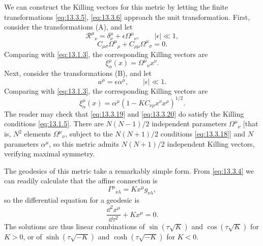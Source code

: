We can construct the Killing vectors for this metric by letting the finite
transformations \eqref{eq:13.3.5}, \eqref{eq:13.3.6} approach the unit
transformation. First, consider the transformations (A), and let
\[
  \mathscr R^\mu{}_\nu
  =
  \delta^\mu_\nu+\epsilon\Omega^\mu{}_\nu,
  \qquad
  \lvert\epsilon\rvert\ll1,
\]
\begin{equation}
  C_{\mu\sigma}\Omega^\mu{}_\rho
  +C_{\rho\mu}\Omega^\mu{}_\sigma
  =
  0.
  \tag{13.3.18}\label{eq:13.3.18}
\end{equation}
Comparing with \eqref{eq:13.1.3}, the corresponding Killing vectors are
\begin{equation}
  \xi^\mu_\alpha(x)=\Omega^\mu{}_\nu x^\nu.
  \tag{13.3.19}\label{eq:13.3.19}
\end{equation}
Next, consider the transformations (B), and let
\[
  a^\mu=\epsilon\alpha^\mu,
  \qquad
  \lvert\epsilon\rvert\ll1.
\]
Comparing with \eqref{eq:13.1.3}, the corresponding Killing vectors are
\begin{equation}
  \xi^\mu_\alpha(x)
  =
  \alpha^\mu
  \left(1-KC_{\nu\rho}x^\nu x^\rho\right)^{1/2}.
  \tag{13.3.20}\label{eq:13.3.20}
\end{equation}
The reader may check that \eqref{eq:13.3.19} and \eqref{eq:13.3.20} do
satisfy the Killing conditions \eqref{eq:13.1.5}. There are \(N(N-1)/2\)
independent parameters \(\Omega^\mu{}_\nu\) [that is, \(N^2\) elements
\(\Omega^\mu{}_\nu\), subject to the \(N(N+1)/2\) conditions
\eqref{eq:13.3.18}] and \(N\) parameters \(\alpha^\mu\), so this metric
admits \(N(N+1)/2\) independent Killing vectors, verifying maximal symmetry.

The geodesics of this metric take a remarkably simple form. From
\eqref{eq:13.3.4} we can readily calculate that the affine connection is
\begin{equation}
  \Gamma^\mu{}_{\nu\lambda}
  =
  Kx^\mu g_{\nu\lambda},
  \tag{13.3.21}\label{eq:13.3.21}
\end{equation}
so the differential equation for a geodesic is
\begin{equation}
  \frac{\dd^2x^\mu}{\dd\tau^2}+Kx^\mu=0.
  \tag{13.3.22}\label{eq:13.3.22}
\end{equation}
The solutions are thus linear combinations of
\(\sin(\tau\sqrt K)\) and \(\cos(\tau\sqrt K)\) for \(K>0\), or of
\(\sinh(\tau\sqrt{-K})\) and \(\cosh(\tau\sqrt{-K})\) for \(K<0\).

